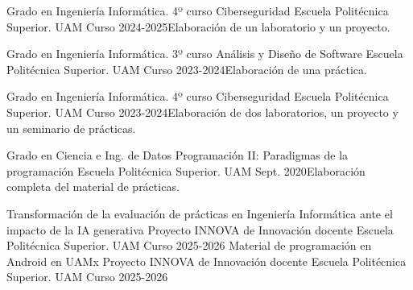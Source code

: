 \begin{cventries}
   \cventry 
   	{Grado en Ingeniería Informática. 4º curso}
	{Ciberseguridad} %
	{Escuela Politécnica Superior. UAM} %
	{Curso 2024-2025}{Elaboración de un laboratorio y un proyecto.}

   \cventry 
   	{Grado en Ingeniería Informática. 3º curso}
	{Análisis y Diseño de Software} %
	{Escuela Politécnica Superior. UAM} %
	{Curso 2023-2024}{Elaboración de una práctica.}

   \cventry 
   	{Grado en Ingeniería Informática. 4º curso}
	{Ciberseguridad} %
	{Escuela Politécnica Superior. UAM} %
	{Curso 2023-2024}{Elaboración de dos laboratorios, un proyecto y un seminario de prácticas.}

   \cventry 
   	{Grado en Ciencia e Ing. de Datos}
	{Programación II: Paradigmas de la programación} %
	{Escuela Politécnica Superior. UAM} %
	{Sept. 2020}{Elaboración completa del material de prácticas.}

   \cventry
	 {Transformación de la evaluación de prácticas en Ingeniería Informática ante el impacto de la IA generativa} %
	 {Proyecto INNOVA de Innovación docente} %
	 {Escuela Politécnica Superior. UAM} %
	 {Curso 2025-2026} %
	 {
	 }
   \cventry
	 {Material de programación en Android en UAMx} %
	 {Proyecto INNOVA de Innovación docente} %
	 {Escuela Politécnica Superior. UAM} %
	 {Curso 2025-2026} %
	 {
	 }



\end{cventries}
